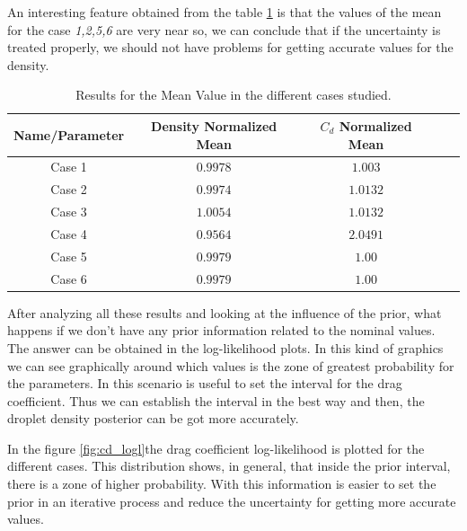 \documentclass{article}
\begin{document}
An interesting feature obtained from the table \ref{table:mean_results2} is that the values of the mean for the case \textit{ 1,2,5,6} are very near so, we can conclude that if the uncertainty is treated properly, we should not have problems for getting accurate values for the density.



\begin{table}[H]
\centering
 \begin{tabular}{||c| c | c | c | c ||}

 \hline
 \textbf{Name/Parameter} & \textbf{   Density Normalized Mean} &\textbf{$C_d$  Normalized Mean }\\ [0.5ex] 
 \hline
 Case 1 &  $0.9978$ & $1.003$  \\  [0.5ex] 
 \hline
 Case 2& $0.9974$ &$1.0132$ \\  [0.5ex] 
 \hline
 Case 3 & $1.0054$ & $1.0132$ \\ [0.5ex] 
 \hline
 Case 4 & $0.9564$ & $2.0491$ \\ [0.5ex] 
 \hline
 Case 5 & $0.9979$ & $1.00$\\ [0.5ex] 
 \hline
 Case 6& $0.9979$ & $1.00$ \\ [0.5ex] 
 \hline
\end{tabular}
\caption{Results for the Mean Value in the different cases studied.}
\label{table:mean_results2}
\end{table}

After analyzing all these results and looking at the influence of the prior,  what happens if  we don't have any prior information related to the nominal values. The answer can be obtained in  the log-likelihood plots. In this kind of graphics  we can see graphically  around which values is the zone of greatest probability for the parameters. In this scenario is useful to set the interval for the drag coefficient. Thus we can establish the interval in the best way and then, the droplet density posterior can be got more accurately.
\par
In the figure \ref{fig:cd_logl}the drag coefficient log-likelihood is plotted for the different cases. This distribution shows, in general, that inside the prior interval, there is a zone of higher probability. With this information is easier to set the prior in an iterative process and reduce the uncertainty for getting more accurate values.
\end{document}
